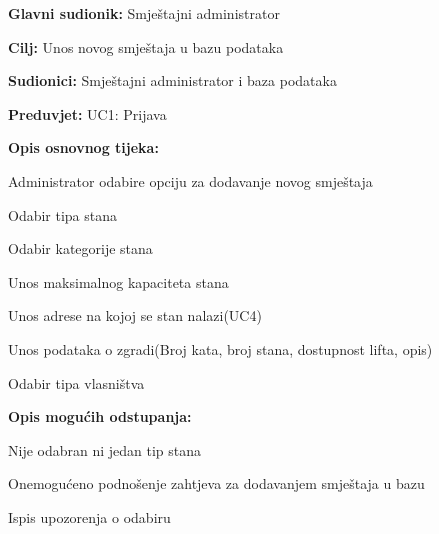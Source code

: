 					\noindent {}
					\begin{packed_item}
						
						\item \textbf{Glavni sudionik: }Smještajni administrator
						\item  \textbf{Cilj:} Unos novog smještaja u bazu podataka
						\item  \textbf{Sudionici:} Smještajni administrator i baza podataka
						\item  \textbf{Preduvjet:} UC1: Prijava
						\item  \textbf{Opis osnovnog tijeka:}
						
						\item[] \begin{packed_enum}
							
							\item Administrator odabire opciju za dodavanje novog smještaja
							\item Odabir tipa stana
							\item Odabir kategorije stana 
							\item Unos maksimalnog kapaciteta stana
							\item Unos adrese na kojoj se stan nalazi(UC4)
							\item Unos podataka o zgradi(Broj kata, broj stana, dostupnost lifta, opis)
							\item Odabir tipa vlasništva
							
						\end{packed_enum}
						
						\item  \textbf{Opis mogućih odstupanja:}
						
						\item[] \begin{packed_item}
							
							\item[2.a] Nije odabran ni jedan tip stana
							\item[] \begin{packed_enum}
								
								\item Onemogućeno podnošenje zahtjeva za dodavanjem smještaja u bazu
								\item Ispis upozorenja o odabiru
								
							\end{packed_enum}
							

\end{packed_item}
\end{packed_item}
